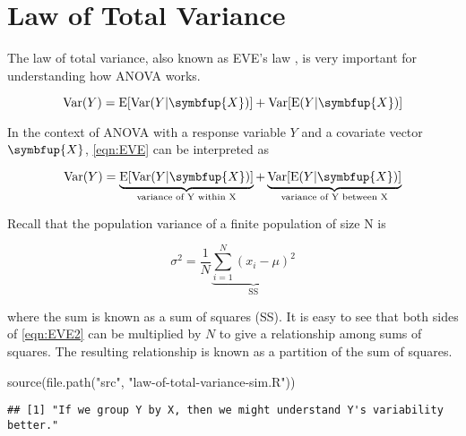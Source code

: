 \documentclass[
]{book}
\newenvironment{Shaded}{\begin{snugshade}}{\end{snugshade}}
\newcommand{\FunctionTok}[1]{\textcolor[rgb]{0.00,0.00,0.00}{#1}}
\newcommand{\NormalTok}[1]{#1}
\newcommand{\StringTok}[1]{\textcolor[rgb]{0.31,0.60,0.02}{#1}}
\begin{document}
\hypertarget{law-of-total-variance}{%
\section{\texorpdfstring{Law of Total Variance \label{EVE}}{Law of Total Variance }}\label{law-of-total-variance}}

The law of total variance, also known as EVE's law \autocite{EVE}\autocite{EVE-intuition}, is very important for understanding how ANOVA works.

\begin{equation}
\label{eqn:EVE}
\mathrm{Var}(Y) = \mathrm{E}[\mathrm{Var}(Y|\symbfup{X})] + \mathrm{Var}[\mathrm{E}(Y|\symbfup{X})]
\end{equation}

In the context of ANOVA with a response variable \(Y\) and a covariate vector \(\symbfup{X}\), \ref{eqn:EVE} can be interpreted as

\begin{equation}
\label{eqn:EVE2}
\mathrm{Var}(Y) = \underbrace{\mathrm{E}[\mathrm{Var}(Y|\symbfup{X})]}_{\text{variance of Y within X}} + \underbrace{\mathrm{Var}[\mathrm{E}(Y|\symbfup{X})]}_{\text{variance of Y between X}}
\end{equation}

Recall \autocite{variance} that the population variance of a finite population of size N is

\begin{equation}
\label{eqn:pop_var}
\sigma^2 = \frac{1}{N} \underbrace{\sum_{i = 1}^{N} \left(x_i-\mu\right)^2}_{\text{SS}}
\end{equation}

where the sum is known as a sum of squares (SS). It is easy to see that both sides of \ref{eqn:EVE2} can be multiplied by \(N\) to give a relationship among sums of squares. The resulting relationship is known as a partition of the sum of squares. \autocite{partition_of_SS}

\begin{Shaded}
\begin{Highlighting}[]
\FunctionTok{source}\NormalTok{(}\FunctionTok{file.path}\NormalTok{(}\StringTok{"src"}\NormalTok{, }\StringTok{"law{-}of{-}total{-}variance{-}sim.R"}\NormalTok{))}
\end{Highlighting}
\end{Shaded}

\begin{verbatim}
## [1] "If we group Y by X, then we might understand Y's variability better."
\end{verbatim}
\end{document}
